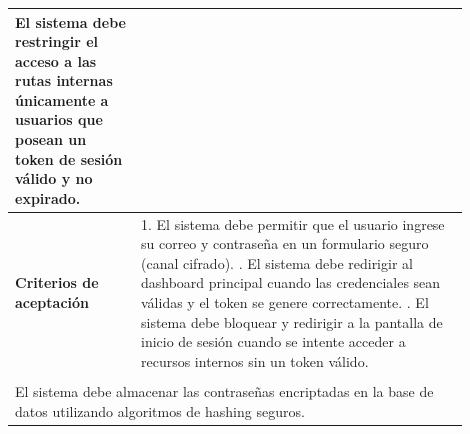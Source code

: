 \begin{longtable}{|p{0.25\linewidth}|p{0.15\linewidth}|p{0.15\linewidth}|p{0.35\linewidth}|}
{		El sistema debe restringir el acceso a las rutas internas únicamente a usuarios que posean un token de sesión válido y no expirado.}                                                                \\ \hline
		\cellcolor{tableheaderblue}\textbf{Criterios de aceptación} & \multicolumn{3}{p{0.70\linewidth}|}{                                                                                                  %
			1. El sistema debe permitir que el usuario ingrese su correo y contraseña en un formulario seguro (canal cifrado). \newline
			2. El sistema debe redirigir al dashboard principal cuando las credenciales sean válidas y el token se genere correctamente. \newline
		3. El sistema debe bloquear y redirigir a la pantalla de inicio de sesión cuando se intente acceder a recursos internos sin un token válido.}                                                       \\ \hline
		\rowcolor{tableheaderblue}
		\multicolumn{4}{|l|}{\textbf{Restricciones}}                                                                                                                                                        \\ \hline
		\multicolumn{4}{|p{0.96\linewidth}|}{%
		El sistema debe almacenar las contraseñas encriptadas en la base de datos utilizando algoritmos de hashing seguros.}                                                                                \\ \hline
	
\end{longtable}
\endgroup



